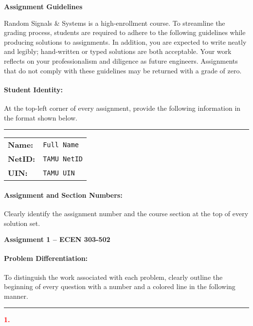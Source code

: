 \documentclass[11pt]{article}
\begin{document}
\begin{center}
{\bfseries \LARGE Assignment Guidelines}
\end{center}

Random Signals \& Systems is a high-enrollment course.
To streamline the grading process, students are required to adhere to the following guidelines while producing solutions to assignments.
In addition, you are expected to write neatly and legibly; hand-written or typed solutions are both acceptable.
Your work reflects on your professionalism and diligence as future engineers.
Assignments that do not comply with these guidelines may be returned with a grade of zero.


\paragraph{Student Identity:} At the top-left corner of every assignment, provide the following information in the format shown below.

\noindent
\rule[1mm]{\linewidth}{0.5pt}
\begin{tabular}{ll}
\textbf{Name:} & \texttt{Full Name} \\
\textbf{NetID:} & \texttt{TAMU NetID} \\
\textbf{UIN:} & \texttt{TAMU UIN}
\end{tabular}


\paragraph{Assignment and Section Numbers:}
Clearly identify the assignment number and the course section at the top of every solution set.
\begin{center}
\begin{Large}
\textbf{Assignment 1 -- ECEN 303-502}
\end{Large}
\end{center}


\paragraph{Problem Differentiation:}
To distinguish the work associated with each problem, clearly outline the beginning of every question with a number and a colored line in the following manner.

\noindent
\textcolor{red}{\rule[1mm]{\linewidth}{1pt}}
\begin{Large}
\textcolor{red}{\textbf{1.}}
\end{Large}
\end{document}
